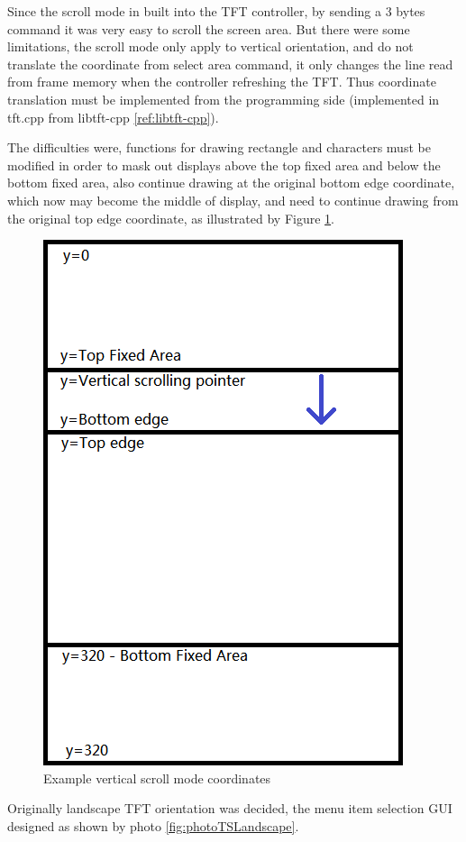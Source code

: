 \documentclass[a4paper,notitlepage,10pt]{report}
\begin{document}
\begin{multicols}{2}
Since the scroll mode in built into the TFT controller, by sending a 3 bytes command it was very easy to scroll the screen area. But there were some limitations, the scroll mode only apply to vertical orientation, and do not translate the coordinate from select area command, it only changes the line read from frame memory when the controller refreshing the TFT. Thus coordinate translation must be implemented from the programming side (implemented in tft.cpp from libtft-cpp \ref{ref:libtft-cpp}).
\vspace{6pt}

The difficulties were, functions for drawing rectangle and characters must be modified in order to mask out displays above the top fixed area and below the bottom fixed area, also continue drawing at the original bottom edge coordinate, which now may become the middle of display, and need to continue drawing from the original top edge coordinate, as illustrated by Figure \ref{fig:tftVSExample}.
\vspace{6pt}

\begin{figure}[H]
	\centering
	\includegraphics[width=0.6\columnwidth]{tft_vsexample}
	\caption{Example vertical scroll mode coordinates}
	\label{fig:tftVSExample}
\end{figure}
\vspace{6pt}

Originally landscape TFT orientation was decided, the menu item selection GUI designed as shown by photo \ref{fig:photoTSLandscape}.
\vspace{6pt}


\end{multicols}
\end{document}
